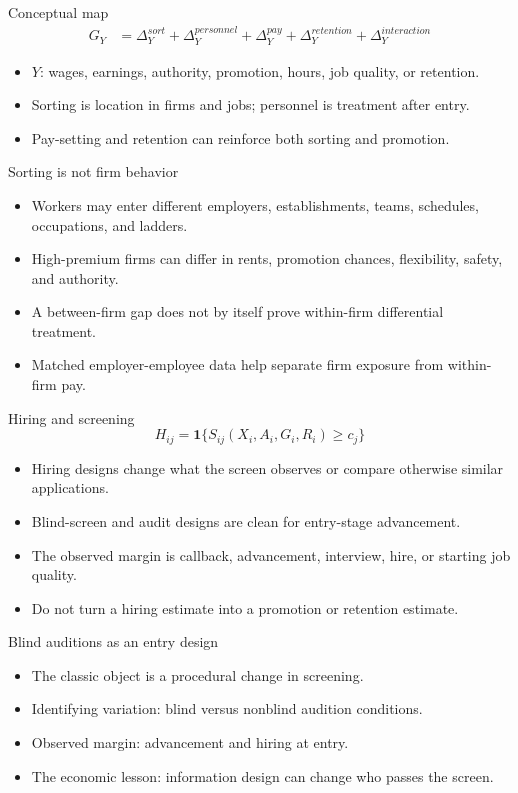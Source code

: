 \documentclass[aspectratio=169,11pt]{beamer}
\begin{document}
\begin{frame}{Conceptual map}
\[
\begin{aligned}
G_Y
&=
\Delta^{sort}_{Y}
+ \Delta^{personnel}_{Y}
+ \Delta^{pay}_{Y}
+ \Delta^{retention}_{Y}
+ \Delta^{interaction}_{Y}
\end{aligned}
\]
\begin{itemize}
    \item \(Y\): wages, earnings, authority, promotion, hours, job quality, or retention.
    \item Sorting is location in firms and jobs; personnel is treatment after entry.
    \item Pay-setting and retention can reinforce both sorting and promotion.
\end{itemize}
\end{frame}

\begin{frame}{Sorting is not firm behavior}
\begin{itemize}
    \item Workers may enter different employers, establishments, teams, schedules, occupations, and ladders.
    \item High-premium firms can differ in rents, promotion chances, flexibility, safety, and authority.
    \item A between-firm gap does not by itself prove within-firm differential treatment.
    \item Matched employer-employee data help separate firm exposure from within-firm pay.
\end{itemize}
\end{frame}

\begin{frame}{Hiring and screening}
\[
H_{ij}=\mathbf{1}\{S_{ij}(X_i,A_i,G_i,R_i)\ge c_j\}
\]
\begin{itemize}
    \item Hiring designs change what the screen observes or compare otherwise similar applications.
    \item Blind-screen and audit designs are clean for entry-stage advancement.
    \item The observed margin is callback, advancement, interview, hire, or starting job quality.
    \item Do not turn a hiring estimate into a promotion or retention estimate.
\end{itemize}
\end{frame}

\begin{frame}{Blind auditions as an entry design}
\begin{itemize}
    \item The classic object is a procedural change in screening.
    \item Identifying variation: blind versus nonblind audition conditions.
    \item Observed margin: advancement and hiring at entry.
    \item The economic lesson: information design can change who passes the screen.
\end{itemize}
\end{frame}
\end{document}
